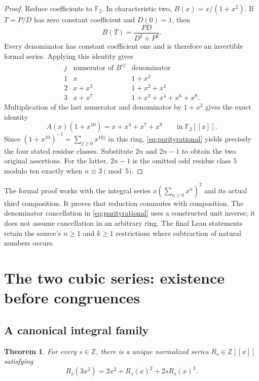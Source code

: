 \documentclass[11pt,a4paper]{article}
\newtheorem{theorem}{Theorem}[section]
\theoremstyle{remark}
\newcommand{\Z}{\mathbb Z}
\newcommand{\F}{\mathbb F}
\newcommand{\ps}[1]{#1[[x]]}
\begin{document}
\begin{proof}
Reduce coefficients to $\F_2$. In characteristic two,
$B(x)=x/(1+x^2)$. If $T=P/D$ has zero constant coefficient and $D(0)=1$,
then
\[
B(T)=\frac{PD}{D^2+P^2}.
\]
Every denominator has constant coefficient one and is therefore an
invertible formal series. Applying this identity gives
\[
\begin{array}{c|c|c}
j & \text{numerator of }B^{\circ j} & \text{denominator}\\ \hline
1 & x & 1+x^2\\
2 & x+x^3 & 1+x^2+x^4\\
3 & x+x^7 & 1+x^2+x^4+x^6+x^8.
\end{array}
\]
Multiplication of the last numerator and denominator by $1+x^2$ gives
the exact identity
\begin{equation}\label{eq:parityrational}
A(x)(1+x^{10})=x+x^3+x^7+x^9\qquad\text{in }\ps{\F_2}.
\end{equation}
Since $(1+x^{10})^{-1}=\sum_{j\ge0}x^{10j}$ in this ring,
\eqref{eq:parityrational} yields precisely the four stated residue classes.
Substitute $2n$ and $2n-1$ to obtain the two original assertions. For
the latter, $2n-1$ is the omitted odd residue class $5$ modulo ten
exactly when $n\equiv3\pmod5$.
\end{proof}

The formal proof works with the integral series $x(\sum_{n\ge0}x^n)^2$
and its actual third composition. It proves that reduction commutes with
composition. The denominator cancellation in
\eqref{eq:parityrational} uses a constructed unit inverse; it does not
assume cancellation in an arbitrary ring. The final Lean statements
retain the source's $n\ge1$ and $k\ge1$ restrictions where subtraction
of natural numbers occurs.

\section{The two cubic series: existence before congruences}

\subsection{A canonical integral family}

\begin{theorem}\label{thm:cubicexist}
For every $s\in\Z$, there is a unique normalized series
$R_s\in\ps{\Z}$ satisfying
\begin{equation}\label{eq:cubicfamily}
R_s(3x^2)=2x^2+R_s(x)^2+2sR_s(x)^3.
\end{equation}
\end{theorem}
\end{document}
